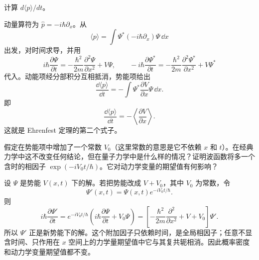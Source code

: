 \begin{question}
计算 $d\langle p\rangle/dt$。
\end{question}
\begin{solution}
动量算符为 $\hat p=-i\hbar\partial_x$。从
\[
\langle p\rangle=\int \Psi^*(-i\hbar\partial_x)\Psi\,\dd x
\]
出发，对时间求导，并用
\[
i\hbar\frac{\partial\Psi}{\partial t}= -\frac{\hbar^2}{2m}\frac{\partial^2\Psi}{\partial x^2}+V\Psi,
\qquad
-i\hbar\frac{\partial\Psi^*}{\partial t}= -\frac{\hbar^2}{2m}\frac{\partial^2\Psi^*}{\partial x^2}+V\Psi^*
\]
代入。动能项经分部积分互相抵消，势能项给出
\[
\frac{\dd\langle p\rangle}{\dd t}
=-\int \Psi^*\frac{\partial V}{\partial x}\Psi\,\dd x.
\]
即
\[
\boxed{\displaystyle \frac{\dd\langle p\rangle}{\dd t}= -\left\langle \frac{\partial V}{\partial x}\right\rangle.}
\]
这就是 Ehrenfest 定理的第二个式子。
\end{solution}

\begin{question}
假定在势能项中增加了一个常数 $V_0$（这里常数的意思是它不依赖 $x$ 和 $t$）。在经典力学中这不改变任何结论，但在量子力学中是什么样的情况？证明波函数将多一个含时的相因子 $\exp(-iV_0t/\hbar)$。它对动力学变量的期望值有何影响？
\end{question}
\begin{solution}
设 $\Psi$ 是势能 $V(x,t)$ 下的解。若把势能改成 $V+V_0$，其中 $V_0$ 为常数，令
\[
\Psi'(x,t)=\Psi(x,t)e^{-iV_0t/\hbar}.
\]
则
\[
i\hbar\frac{\partial\Psi'}{\partial t}
=e^{-iV_0t/\hbar}\left(i\hbar\frac{\partial\Psi}{\partial t}+V_0\Psi\right)
=\left[-\frac{\hbar^2}{2m}\frac{\partial^2}{\partial x^2}+V+V_0\right]\Psi'.
\]
所以 $\Psi'$ 正是新势能下的解。这个附加因子只依赖时间，是全局相因子；任意不显含时间、只作用在 $x$ 空间上的力学量期望值中它与其复共轭相消。因此概率密度和动力学变量期望值都不变。
\end{solution}

